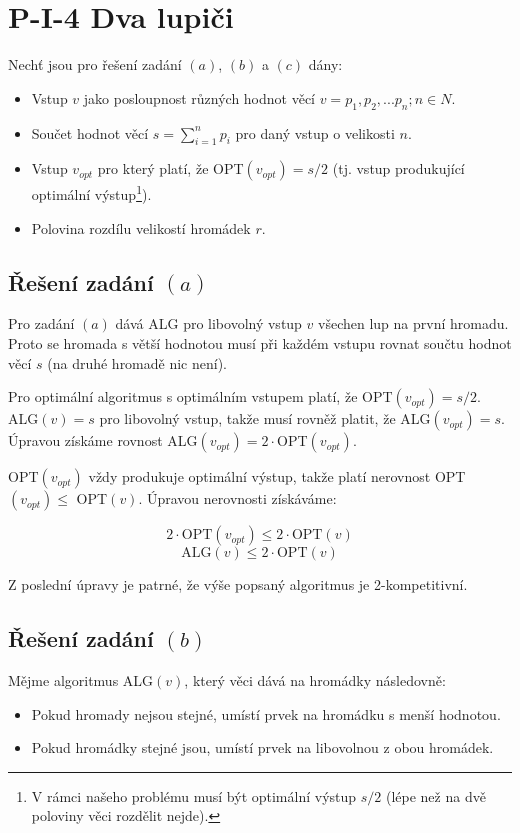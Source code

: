 \documentclass[a4paper, 12pt]{article}
\begin{document}
  \section{P-I-4 Dva lupiči}
  Nechť jsou pro řešení zadání $(a)$, $(b)$ a $(c)$ dány:
  \begin{itemize}[noitemsep]
    \item Vstup $v$ jako posloupnost různých hodnot věcí $v=p_1, p_2,...p_n; n \in N$.
    \item Součet hodnot věcí $s=\sum\limits_{i=1}^n p_i$ pro daný vstup o velikosti $n$.
    \item Vstup $v_{opt}$ pro který platí, že OPT$(v_{opt})=s/2$ (tj. vstup produkující optimální výstup\footnote{V rámci našeho problému musí být optimální výstup $s/2$ (lépe než na dvě poloviny věci rozdělit nejde).}).
    \item Polovina rozdílu velikostí hromádek $r$.
  \end{itemize}

  \subsection{Řešení zadání $(a)$}
  Pro zadání $(a)$ dává ALG pro libovolný vstup $v$ všechen lup na první hromadu. Proto se hromada s větší hodnotou musí při každém vstupu rovnat součtu hodnot věcí $s$ (na druhé hromadě nic není).

  Pro optimální algoritmus s optimálním vstupem platí, že OPT$(v_{opt})=s/2$.
  ALG$(v)=s$ pro libovolný vstup, takže musí rovněž platit, že ALG$(v_{opt})=s$. Úpravou získáme rovnost ALG$(v_{opt}) = 2 \cdot$OPT$(v_{opt})$.

  OPT$(v_{opt})$ vždy produkuje optimální výstup, takže platí nerovnost OPT$(v_{opt}) \le$ OPT$(v)$. Úpravou nerovnosti získáváme:

  $$2 \cdot\text{OPT}(v_{opt}) \le 2\cdot\text{OPT}(v)$$
  $$\text{ALG}(v) \le 2 \cdot\text{OPT}(v)$$

  Z poslední úpravy je patrné, že výše popsaný algoritmus je 2-kompetitivní.

  \subsection{Řešení zadání $(b)$}
  Mějme algoritmus ALG$(v)$, který věci dává na hromádky následovně:
  \begin{itemize}
    \item Pokud hromady nejsou stejné, umístí prvek na hromádku s menší hodnotou.
    \item Pokud hromádky stejné jsou, umístí prvek na libovolnou z obou hromádek.
  \end{itemize}
\end{document}
